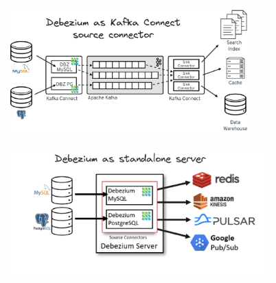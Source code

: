 \documentclass[10pt,utf8]{beamer}
\begin{document}
\begin{frame}
    \begin{figure}
        \centering
        \includegraphics[height=5cm]{./img/debezium_kafka.eps}
    \end{figure}
    
    \vspace{-0.5cm}
    
    \begin{figure}
        \centering
        \includegraphics[height=5cm]{./img/debezium_server.eps}
    \end{figure}
\end{frame}
\end{document}
